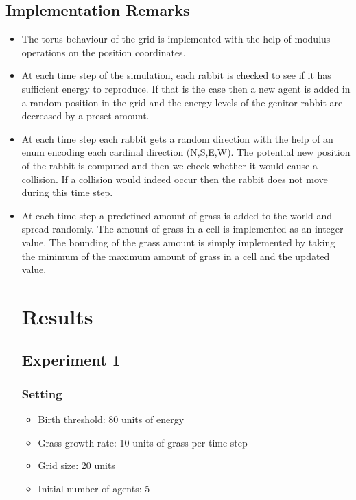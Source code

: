 \documentclass[11pt]{article}
\begin{document}
\subsection{Implementation Remarks}
\begin{itemize}
\item The torus behaviour of the grid is implemented with the help of modulus
  operations on the position coordinates.
\item At each time step of the simulation, each rabbit is checked to see if
  it has sufficient energy to reproduce. If that is the case then a new
  agent is added in a random position in the grid and the energy levels of
  the genitor rabbit are decreased by a preset amount.
\item At each time step each rabbit gets a random direction with the help of an
  enum encoding each cardinal direction (N,S,E,W). The potential new position of
  the rabbit is computed and then we check whether it would cause a collision.
  If a collision would indeed occur then the rabbit does not move during this
  time step.
\item At each time step a predefined amount of grass is added to the world and
  spread randomly. The amount of grass in a cell is implemented as an integer
  value. The bounding of the grass amount is simply implemented by taking the
  minimum of the maximum amount of grass in a cell and the updated value.
  
\section{Results}

\subsection{Experiment 1}

\subsubsection{Setting}
\begin{itemize}
\item Birth threshold: 80 units of energy
\item Grass growth rate: 10 units of grass per time step
\item Grid size: 20  units
\item Initial number of agents: 5


\end{itemize}
\end{itemize}
\end{document}
